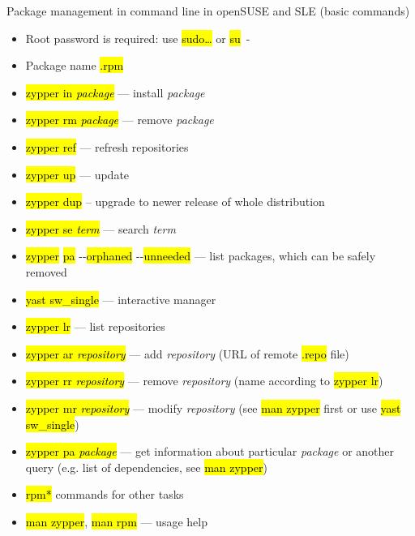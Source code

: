 \documentclass[compress, ucs, xelatex, 11pt, xcolor=svgnames, aspectratio=169,
	hyperref={
		bookmarks=true,
		unicode=true,
		colorlinks=true,
		pdftitle={Linux, command line and MetaCentrum},
		plainpages=false,
		pdfauthor={Vojtech Zeisek},
		pdfsubject={Course about use of Linux command line, writing shell scripts and using MetaCentrum of CESNET},
		pdfcreator={XeLaTeX},
		pdfkeywords={Linux, GNU, BASH, shell, command line, MetaCentrum},
		linkcolor=DarkRed, %
		anchorcolor=DarkBlue, %
		citecolor=Indigo, %
		filecolor=NavyBlue, %
		menucolor=DarkMagenta, %
		urlcolor=DarkBlue, %
		pdftex},
	url={hyphens, lowtilde} %
	]{beamer}
\renewcommand{\texttt}[1]{\hl{\ttfamily #1}}
\begin{document}
\begin{frame}[allowframebreaks]{Package management in command line in openSUSE and SLE (basic commands)}
	\begin{itemize}
		\item Root password is required: use \texttt{sudo\ldots} or \texttt{su}~-
		\item Package name \texttt{*.rpm}
		\item \texttt{zypper in \textit{package}} --- install \textit{package}
		\item \texttt{zypper rm \textit{package}} --- remove \textit{package}
		\item \texttt{zypper ref} --- refresh repositories
		\item \texttt{zypper up} --- update
		\item \texttt{zypper dup} -- upgrade to newer release of whole distribution
		\item \texttt{zypper se \textit{term}} --- search \textit{term}
		\item \texttt{zypper} \texttt{pa} -{-}\texttt{orphaned} -{-}\texttt{unneeded} --- list packages, which can be safely removed
		\item \texttt{yast sw\_single} --- interactive manager
		\item \texttt{zypper lr} --- list repositories
		\item \texttt{zypper ar \textit{repository}} --- add \textit{repository} (URL of remote \texttt{*.repo} file)
		\item \texttt{zypper rr \textit{repository}} --- remove \textit{repository} (name according to \texttt{zypper lr})
		\item \texttt{zypper mr \textit{repository}} --- modify \textit{repository} (see \texttt{man zypper} first or use \texttt{yast sw\_single})
		\item \texttt{zypper pa \textit{package}} --- get information about particular \textit{package} or another query (e.g. list of dependencies, see \texttt{man zypper})
		\item \texttt{rpm*} commands for other tasks
		\item \texttt{man zypper}, \texttt{man rpm} --- usage help
	\end{itemize}
\end{frame}
\end{document}
